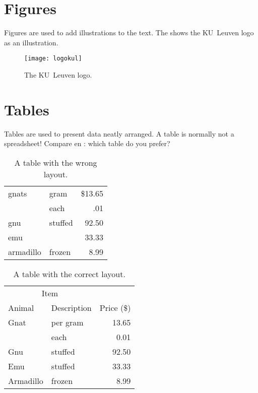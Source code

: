 \section{Figures}
Figures are used to add illustrations to the text. The  shows
the KU~Leuven logo as an illustration.
\begin{figure}
  \centering
  \texttt{[image: logokul]}
  \caption{The KU~Leuven logo.}
  \label{fig:logo}
\end{figure}

\section{Tables}
Tables are used to present data neatly arranged. A table is normally
not a spreadsheet! Compare  en : which table do
you prefer?

\begin{table}
  \centering
  \begin{tabular}{||l|lr||} \hline
    gnats     & gram      & \$13.65 \\ \cline{2-3}
              & each      & .01 \\ \hline
    gnu       & stuffed   & 92.50 \\ \cline{1-1} \cline{3-3}
    emu       &           & 33.33 \\ \hline
    armadillo & frozen    & 8.99 \\ \hline
  \end{tabular}
  \caption{A table with the wrong layout.}
  \label{tab:wrong}
\end{table}

\begin{table}
  \centering
  \begin{tabular}{@{}llr@{}} \toprule
    \multicolumn{2}{c}{Item} \\ \cmidrule(r){1-2}
    Animal    & Description & Price (\$)\\ \midrule
    Gnat      & per gram    & 13.65 \\
              & each        & 0.01 \\
    Gnu       & stuffed     & 92.50 \\
    Emu       & stuffed     & 33.33 \\
    Armadillo & frozen      & 8.99 \\ \bottomrule
  \end{tabular}
  \caption{A table with the correct layout.}
  \label{tab:ok}
\end{table}

